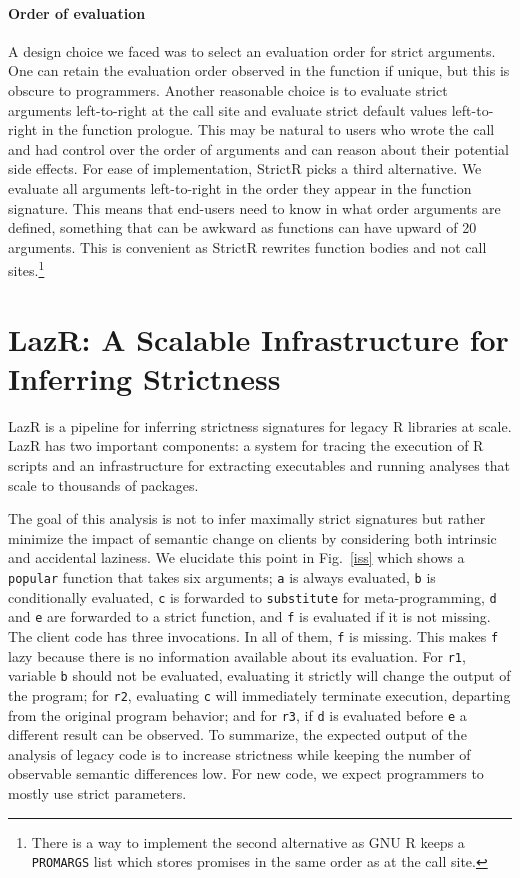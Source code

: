 \documentclass[screen,acmsmall]{acmart}
\renewcommand{\c}[1]{\lstinline |#1|\xspace}
\newcommand{\strictr}{{\sf StrictR}\xspace}
\newcommand{\lazr}{{\sf LazR}\xspace}
\begin{document}
\paragraph{Order of evaluation} A design choice we faced was to select an
evaluation order for strict arguments. One can retain the evaluation order
observed in the function if unique, but this is obscure to programmers. Another
reasonable choice is to evaluate strict arguments left-to-right at the call site
and evaluate strict default values left-to-right in the function prologue. This
may be natural to users who wrote the call and had control over the order of
arguments and can reason about their potential side effects. For ease of
implementation, \strictr picks a third alternative. We evaluate all arguments
left-to-right in the order they appear in the function signature. This means
that end-users need to know in what order arguments are defined, something that
can be awkward as functions can have upward of 20 arguments. This is convenient
as \strictr rewrites function bodies and not call sites.\footnote{There is a way
  to implement the second alternative as GNU R keeps a \c{PROMARGS} list which
  stores promises in the same order as at the call site.}



\section{LazR: A Scalable Infrastructure for Inferring Strictness}\label{sec:lazr}

\lazr is a pipeline for inferring strictness signatures for legacy R libraries
at scale. \lazr has two important components: a system for tracing the execution
of R scripts and an infrastructure for extracting executables and running
analyses that scale to thousands of packages.


The goal of this analysis is not to infer maximally strict signatures but rather
minimize the impact of semantic change on clients by considering both intrinsic
and accidental laziness. We elucidate this point in Fig.~\ref{iss} which
shows a \c{popular} function that takes six arguments; \c{a} is always
evaluated, \c{b} is conditionally evaluated, \c{c} is forwarded to
\c{substitute} for meta-programming, \c{d} and \c{e} are forwarded to a
strict function, and \c{f} is evaluated if it is not missing. The client code
has three invocations. In all of them, \c{f} is missing. This makes \c{f}
lazy because there is no information available about its evaluation. For \c{r1},
variable \c b should not be evaluated, evaluating it strictly will change the
output of the program; for \c{r2}, evaluating \c{c} will immediately
terminate execution, departing from the original program behavior; and for
\c{r3}, if \c{d} is evaluated before \c{e} a different result can be observed.
To summarize, the expected output of the analysis of legacy code is to increase
strictness while keeping the number of observable semantic differences low. For
new code, we expect programmers to mostly use strict parameters.
\end{document}
